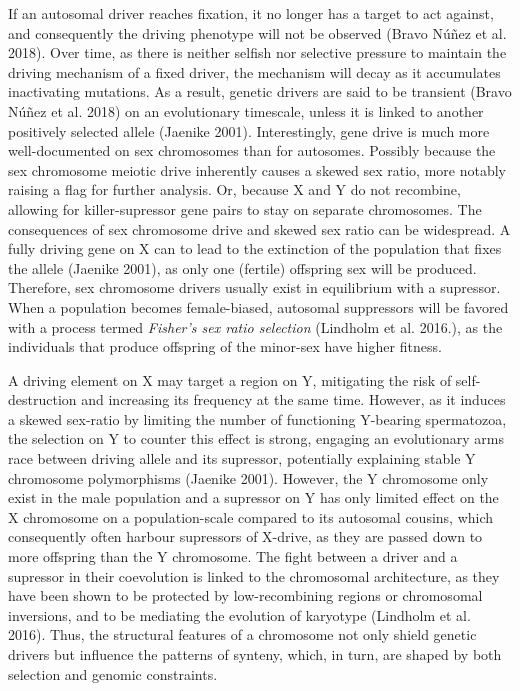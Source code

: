 \documentclass[
  11pt,
  a4paper,
]{scrbook}
\begin{document}
If an autosomal driver reaches fixation, it no longer has a target to
act against, and consequently the driving phenotype will not be observed
(Bravo Núñez et al. 2018). Over time, as there is neither selfish nor
selective pressure to maintain the driving mechanism of a fixed driver,
the mechanism will decay as it accumulates inactivating mutations. As a
result, genetic drivers are said to be transient (Bravo Núñez et al.
2018) on an evolutionary timescale, unless it is linked to another
positively selected allele (Jaenike 2001). Interestingly, gene drive is
much more well-documented on sex chromosomes than for autosomes.
Possibly because the sex chromosome meiotic drive inherently causes a
skewed sex ratio, more notably raising a flag for further analysis. Or,
because X and Y do not recombine, allowing for killer-supressor gene
pairs to stay on separate chromosomes. The consequences of sex
chromosome drive and skewed sex ratio can be widespread. A fully driving
gene on X can to lead to the extinction of the population that fixes the
allele (Jaenike 2001), as only one (fertile) offspring sex will be
produced. Therefore, sex chromosome drivers usually exist in equilibrium
with a supressor. When a population becomes female-biased, autosomal
suppressors will be favored with a process termed \emph{Fisher's sex
ratio selection} (Lindholm et al. 2016.), as the individuals that
produce offspring of the minor-sex have higher fitness.

A driving element on X may target a region on Y, mitigating the risk of
self-destruction and increasing its frequency at the same time. However,
as it induces a skewed sex-ratio by limiting the number of functioning
Y-bearing spermatozoa, the selection on Y to counter this effect is
strong, engaging an evolutionary arms race between driving allele and
its supressor, potentially explaining stable Y chromosome polymorphisms
(Jaenike 2001). However, the Y chromosome only exist in the male
population and a supressor on Y has only limited effect on the X
chromosome on a population-scale compared to its autosomal cousins,
which consequently often harbour supressors of X-drive, as they are
passed down to more offspring than the Y chromosome. The fight between a
driver and a supressor in their coevolution is linked to the chromosomal
architecture, as they have been shown to be protected by low-recombining
regions or chromosomal inversions, and to be mediating the evolution of
karyotype (Lindholm et al. 2016). Thus, the structural features of a
chromosome not only shield genetic drivers but influence the patterns of
synteny, which, in turn, are shaped by both selection and genomic
constraints.
\end{document}
